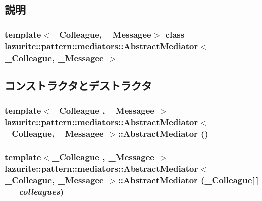 \subsection{説明}
\subsubsection*{template$<$\_\-Colleague, \_\-Messagee$>$ class lazurite::pattern::mediators::AbstractMediator$<$ \_\-Colleague, \_\-Messagee $>$}



\subsection{コンストラクタとデストラクタ}
\hypertarget{classlazurite_1_1pattern_1_1mediators_1_1_abstract_mediator_3_01___colleague_00_01___messagee_01_4_a72f12600a5611014b2773ec637f79851}{
\subsubsection[{AbstractMediator}]{\setlength{\rightskip}{0pt plus 5cm}template$<$\_\-Colleague , \_\-Messagee $>$ lazurite::pattern::mediators::AbstractMediator$<$ \_\-Colleague, \_\-Messagee $>$::AbstractMediator ()}}
\label{classlazurite_1_1pattern_1_1mediators_1_1_abstract_mediator_3_01___colleague_00_01___messagee_01_4_a72f12600a5611014b2773ec637f79851}
\hypertarget{classlazurite_1_1pattern_1_1mediators_1_1_abstract_mediator_3_01___colleague_00_01___messagee_01_4_aa200e399a08bc6a8b0c765a205f39b09}{
\subsubsection[{AbstractMediator}]{\setlength{\rightskip}{0pt plus 5cm}template$<$\_\-Colleague , \_\-Messagee $>$ lazurite::pattern::mediators::AbstractMediator$<$ \_\-Colleague, \_\-Messagee $>$::AbstractMediator (\_\-Colleague\mbox{[}$\,$\mbox{]} {\em \_\-\_\-colleagues})}}
\label{classlazurite_1_1pattern_1_1mediators_1_1_abstract_mediator_3_01___colleague_00_01___messagee_01_4_aa200e399a08bc6a8b0c765a205f39b09}

